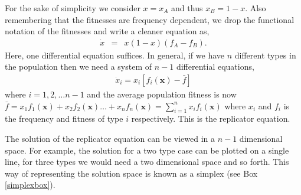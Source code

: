 \documentclass[oneside,11pt,a4paper]{book}
\begin{document}
%
For the sake of simplicity we consider $x = x_A$ and thus $x_B=1-x$.
Also remembering that the fitnesses are frequency dependent, we drop the functional notation of the fitnesses and write a cleaner equation as,
%
\begin{eqnarray}
\label{eq:simplerep}
\dot{x} &=& x (1-x) \left(f_A - f_B \right).
\end{eqnarray}
%
Here, one differential equation suffices.
In general, if we have $n$ different types in the population then we need a system of $n-1$ differential equations,
%
\begin{eqnarray}
\label{eq:repeq}
\boxed{ 
\dot{x}_i = x_i \left[f_i (\mathbf{x}) - \bar{f} \right]
}
\end{eqnarray}
%
where $i = 1,2,\ldots n-1$ and the average population fitness is now $\bar{f} = x_1 f_1(\mathbf{x}) + x_2 f_2(\mathbf{x}) \ldots + x_n f_n(\mathbf{x}) = \sum_{i=1}^{n} x_i f_i (\mathbf{x})$ where $x_i$ and $f_i$ is the frequency and fitness of type $i$ respectively.
This is the replicator equation.

The solution of the replicator equation can be viewed in a $n-1$ dimensional space.
For example, the solution for a two type case can be plotted on a single line, for three types we would need a two dimensional space and so forth.
This way of representing the solution space is known as a simplex (see Box \ref{simplexbox}).
\\
\end{document}

